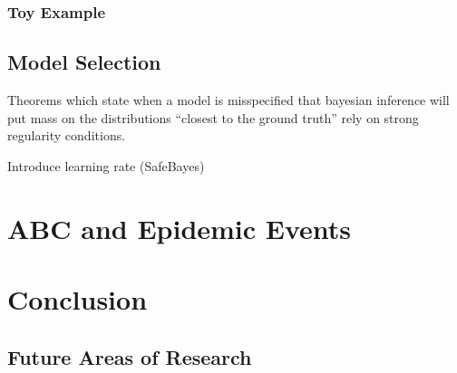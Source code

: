 \documentclass[bibliography=totoc,11pt,a4paper,margin=0]{article}
\theoremstyle{break}
\begin{document}
\subsubsection{Toy Example}\label{sec_summary_statistics_toy}

\subsection{Model Selection}

  \par Theorems which state when a model is misspecified that bayesian inference will put mass on the distributions ``closest to the ground truth'' rely on strong regularity conditions. \cite[]{inconsistency_of_bayesian_inference_for_misspecified_linear_models_and_a_proposal_for_reparing_it}
  \par Introduce learning rate (SafeBayes) \cite[]{inconsistency_of_bayesian_inference_for_misspecified_linear_models_and_a_proposal_for_reparing_it}

\newpage
\section{ABC and Epidemic Events}\label{sec_epidemic_events}

\newpage
\section{Conclusion}

\subsection{Future Areas of Research}


\newpage


\end{document}
